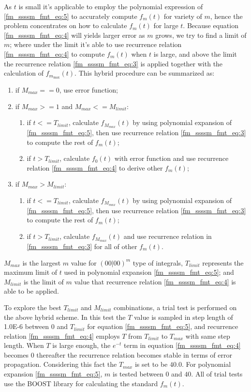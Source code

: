 As $t$ is small it's applicable to employ the polynomial expression of \ref{fm_ssssm_fmt_eq:5} to 
accurately compute $f_{m}(t)$ for variety of $m$, hence the problem concentrates on how to calculate 
$f_{m}(t)$ for large $t$. Because equation \ref{fm_ssssm_fmt_eq:4} will yields larger error as $m$ grows, 
we try to find a limit of $m$; where under the limit it's able to use recurrence relation
\ref{fm_ssssm_fmt_eq:4} to compute $f_{m}(t)$ when $t$ is large, and above the limit the recurrence 
relation \ref{fm_ssssm_fmt_eq:3} is applied together with the calculation of $f_{m_{\max}}(t)$. This 
hybrid procedure can be summarized as:
\begin{enumerate}
 \item if $M_{max} == 0$, use error function;
 \item if $M_{max} >= 1$ and $M_{max} <= M_{limit}$:
 \begin{enumerate}
  \item if $t<=T_{limit}$, calculate $f_{M_{max}}(t)$ by using polynomial expansion of 
  \ref{fm_ssssm_fmt_eq:5}, then use recurrence relation \ref{fm_ssssm_fmt_eq:3} to compute 
  the rest of $f_{m}(t)$;
  \item if $t>T_{limit}$, calculate $f_{0}(t)$ with error function and 
  use recurrence relation \ref{fm_ssssm_fmt_eq:4} to derive other $f_{m}(t)$;
  \end{enumerate}
 \item if $M_{max} > M_{limit}$:
  \begin{enumerate}
     \item if $t<=T_{limit}$, calculate $f_{M_{max}}(t)$ by using polynomial expansion of 
  \ref{fm_ssssm_fmt_eq:5}, then use recurrence relation \ref{fm_ssssm_fmt_eq:3} to compute 
  the rest of $f_{m}(t)$;
   \item  if $t>T_{limit}$, calculate $f_{M_{max}}(t)$ 
  and use recurrence relation in \ref{fm_ssssm_fmt_eq:3} for all of other $f_{m}(t)$.
  \end{enumerate}
 \end{enumerate}
$M_{max}$ is the largest $m$ value for $(00|00)^{m}$ type of integrals, $T_{limit}$
represents the maximum limit of $t$ used in polynomial expansion \ref{fm_ssssm_fmt_eq:5};
and $M_{limit}$ is the limit of $m$ value that recurrence relation \ref{fm_ssssm_fmt_eq:4}
is able to be applied.

To explore the best $T_{limit}$ and $M_{limit}$ combinations, a trial test is performed on
the above hybrid scheme. In this test the $T$ value is sampled in step length of 1.0E-6
between $0$ and $T_{limit}$ for equation \ref{fm_ssssm_fmt_eq:5}, and recurrence relation 
\ref{fm_ssssm_fmt_eq:4} employs $T$ from $T_{limit}$ to $T_{max}$ with same step length.
When $T$ is large enough, the $e^{-t}$ term in equation \ref{fm_ssssm_fmt_eq:4} 
becomes 0 thereafter the recurrence relation becomes stable in terms of error propagation.
Considering this fact the $T_{max}$ is set to be $40.0$. For polynomial expansion 
\ref{fm_ssssm_fmt_eq:5}, $m$ is tested between $0$ and $40$. All of trial tests use 
the BOOST library for calculating the standard $f_{m}(t)$.

